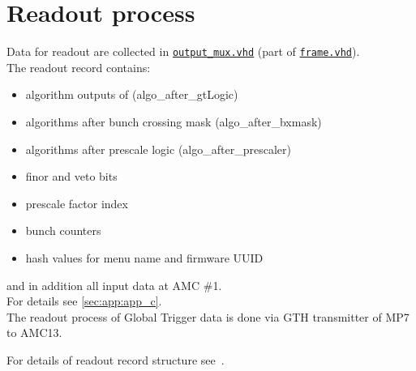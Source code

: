 \section{Readout process}\label{sec:rop:rop}

Data for readout are collected in \href{\gitbranch/firmware/hdl/payload/frame/output_mux.vhd}{\texttt{\textquotesingle output\_mux.vhd\textquotesingle }} (part of \href{\gitbranch/firmware/hdl/payload/frame.vhd}{\texttt{\textquotesingle frame.vhd\textquotesingle }}).\\
The readout record contains:
\begin{itemize}
\item algorithm outputs of \ugtl (algo\_after\_gtLogic)
\item algorithms after bunch crossing mask (algo\_after\_bxmask)
\item algorithms after prescale logic (algo\_after\_prescaler)
\item finor and veto bits
\item prescale factor index
\item bunch counters
\item hash values for menu name and firmware UUID
\end{itemize}
and in addition all input data at AMC \#1.\\
For details see \ref{sec:app:app_c}.\\
The readout process of Global Trigger data is done via GTH transmitter of MP7 to AMC13.

For details of readout record structure see~\cite{ROR}.

\clearpage
